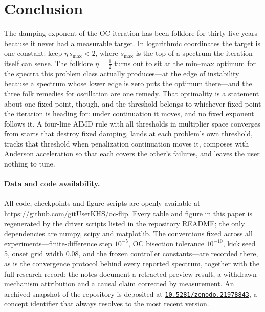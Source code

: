 \documentclass[11pt,a4paper]{article}
\newcommand{\smax}{s_{\max}}
\begin{document}
\section{Conclusion}\label{sec:conclusion}

The damping exponent of the OC iteration has been folklore for
thirty-five years because it never had a measurable target. In
logarithmic coordinates the target is one constant: keep
$\eta\,\smax<2$, where $\smax$ is the top of a spectrum the iteration
itself can sense. The folklore $\eta=\tfrac12$ turns out to sit at the
min--max optimum for the spectra this problem class actually
produces---at the edge of instability because a spectrum whose lower
edge is zero puts the optimum there---and the three folk remedies for
oscillation are one remedy. That optimality is a statement about one
fixed point, though, and the threshold belongs to whichever fixed point
the iteration is heading for: under continuation it moves, and no fixed
exponent follows it. A four-line AIMD rule with all thresholds in
multiplier space
converges from starts that destroy fixed damping, lands at each
problem's own threshold, tracks that threshold when penalization
continuation moves it, composes with Anderson acceleration so that
each covers the other's failures, and leaves the user nothing to tune.

\paragraph*{Data and code availability.} All code, checkpoints and
figure scripts are openly available at
\url{https://github.com/gitUserKHS/oc-flip}. Every table and figure in
this paper is regenerated by the driver scripts listed in the
repository README; the only dependencies are \textsf{numpy},
\textsf{scipy} and \textsf{matplotlib}. The conventions fixed across
all experiments---finite-difference step $10^{-5}$, OC bisection
tolerance $10^{-10}$, kick seed 5, onset grid width $0.08$, and the
frozen controller constants---are recorded there, as is the convergence
protocol behind every reported spectrum, together with the full
research record: the notes document a retracted preview result, a
withdrawn mechanism attribution and a causal claim corrected by
measurement. An archived snapshot of the repository is deposited at
\href{https://doi.org/10.5281/zenodo.21978843}
{\texttt{10.5281/zenodo.21978843}}, a concept identifier that always
resolves to the most recent version.
\end{document}

